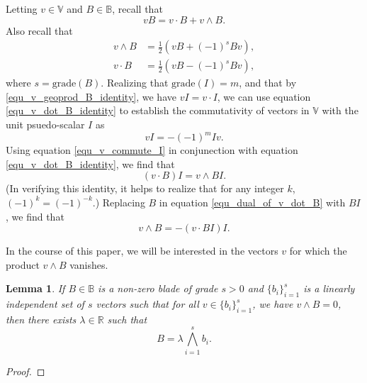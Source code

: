 \documentclass{birkjour}
\newtheorem{lem}[thm]{Lemma}
\theoremstyle{definition}
\theoremstyle{remark}
\numberwithin{equation}{section}
\newcommand{\R}{\mathbb{R}}
\newcommand{\B}{\mathbb{B}}
\newcommand{\V}{\mathbb{V}}
\newcommand{\grade}{\mbox{grade}}
\begin{document}
Letting $v\in\V$ and $B\in\B$, recall that
\begin{equation}\label{equ_v_geoprod_B_identity}
vB = v\cdot B+v\wedge B.
\end{equation}
Also recall that
\begin{align}
v\wedge B &= \frac{1}{2}(vB+(-1)^sBv),\label{equ_v_wedge_B_identity} \\
v\cdot B &= \frac{1}{2}(vB-(-1)^sBv),\label{equ_v_dot_B_identity}
\end{align}
where $s=\grade(B)$.
Realizing that $\grade(I)=m$, and that by \eqref{equ_v_geoprod_B_identity}, we have $vI=v\cdot I$, we can use
equation \eqref{equ_v_dot_B_identity} to establish the commutativity of vectors in $\V$ with the unit psuedo-scalar $I$ as
\begin{equation}\label{equ_v_commute_I}
vI = -(-1)^mIv.
\end{equation}
Using equation \eqref{equ_v_commute_I} in conjunection with equation \eqref{equ_v_dot_B_identity}, we find that
\begin{equation}\label{equ_dual_of_v_dot_B}
(v\cdot B)I = v\wedge BI.
\end{equation}
(In verifying this identity, it helps to realize that for any integer $k$, $(-1)^k=(-1)^{-k}$.)
Replacing $B$ in equation \eqref{equ_dual_of_v_dot_B} with $BI$, we find that
\begin{equation}\label{equ_dual_of_v_dot_dual_B}
v\wedge B = -(v\cdot BI)I.
\end{equation}

In the course of this paper, we will be interested in the vectors $v$ for which the
product $v\wedge B$ vanishes.
\begin{lem}
If $B\in\B$ is a non-zero blade of grade $s>0$ and $\{b_i\}_{i=1}^s$ is a linearly
independent set of $s$ vectors such that for all $v\in\{b_i\}_{i=1}^s$, we have
$v\wedge B=0$, then there exists $\lambda\in\R$ such that
\begin{equation*}
B = \lambda\bigwedge_{i=1}^s b_i.
\end{equation*}
\end{lem}
\begin{proof}
\end{proof}
\end{document}
